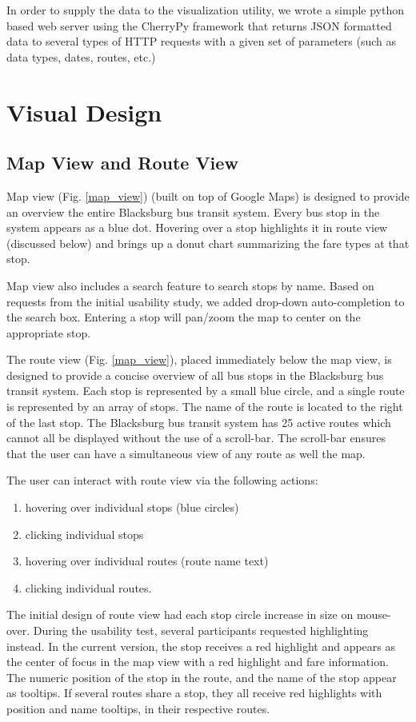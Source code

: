 \documentclass[journal]{vgtc}                %
\begin{document}
In order to supply the data to the visualization utility, we wrote a simple python based web server using the CherryPy framework that returns JSON formatted data to several types of HTTP requests with a given set of parameters (such as data types, dates, routes, etc.)

\section{Visual Design}
\subsection{Map View and Route View}

Map view (Fig. \ref{map_view}) (built on top of Google Maps) is designed to provide an overview the entire Blacksburg bus transit system. Every bus stop in the system appears as a blue dot. Hovering over a stop highlights it in route view (discussed below) and brings up a donut chart summarizing the fare types at that stop.

Map view also includes a search feature to search stops by name. Based on requests from the initial usability study, we added drop-down auto-completion to the search box. Entering a stop will pan/zoom the map to center on the appropriate stop.

The route view (Fig. \ref{map_view}), placed immediately below the map view, is designed to provide a concise overview of all bus stops in the Blacksburg bus transit system. Each stop is represented by a small blue circle, and a single route is represented by an array of stops. The name of the route is located to the right of the last stop. The Blacksburg bus transit system has 25 active routes which cannot all be displayed without the use of a scroll-bar. The scroll-bar ensures that the user can have a simultaneous view of any route as well the map. 

The user can interact with route view via the following actions:
\begin{enumerate}
  \item hovering over individual stops (blue circles)
  \item clicking individual stops 
  \item hovering over individual routes (route name text)
  \item clicking individual routes.
\end{enumerate}

The initial design of route view had each stop circle increase in size on mouse-over. During the usability test, several participants requested highlighting instead. In the current version, the stop receives a red highlight and appears as the center of focus in the map view with a red highlight and fare information. The numeric position of the stop in the route, and the name of the stop appear as tooltips. If several routes share a stop, they all receive red highlights with position and name tooltips, in their respective routes. 
\end{document}
